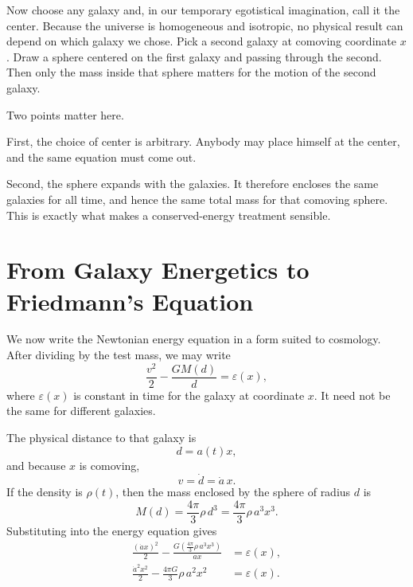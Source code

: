 Now choose any galaxy and, in our temporary egotistical imagination, call it the center. Because the universe is homogeneous and isotropic, no physical result can depend on which galaxy we chose. Pick a second galaxy at comoving coordinate \(x\). Draw a sphere centered on the first galaxy and passing through the second. Then only the mass inside that sphere matters for the motion of the second galaxy.

Two points matter here.

First, the choice of center is arbitrary. Anybody may place himself at the center, and the same equation must come out.

Second, the sphere expands with the galaxies. It therefore encloses the same galaxies for all time, and hence the same total mass for that comoving sphere. This is exactly what makes a conserved-energy treatment sensible.

\section{From Galaxy Energetics to Friedmann's Equation}

We now write the Newtonian energy equation in a form suited to cosmology. After dividing by the test mass, we may write
\begin{equation}
\frac{v^2}{2}-\frac{GM(d)}{d}=\varepsilon(x),
\end{equation}
where \(\varepsilon(x)\) is constant in time for the galaxy at coordinate \(x\). It need not be the same for different galaxies.

The physical distance to that galaxy is
\begin{equation}
d=a(t)x,
\end{equation}
and because \(x\) is comoving,
\begin{equation}
v=\dot d=\dot a\,x.
\end{equation}
If the density is \(\rho(t)\), then the mass enclosed by the sphere of radius \(d\) is
\begin{equation}
M(d)=\frac{4\pi}{3}\rho\,d^3=\frac{4\pi}{3}\rho\,a^3x^3.
\end{equation}
Substituting into the energy equation gives
\begin{align}
\frac{(\dot a x)^2}{2}-\frac{G\left(\frac{4\pi}{3}\rho\,a^3x^3\right)}{ax} &= \varepsilon(x), \\
\frac{\dot a^2x^2}{2}-\frac{4\pi G}{3}\rho\,a^2x^2 &= \varepsilon(x).
\end{align}

